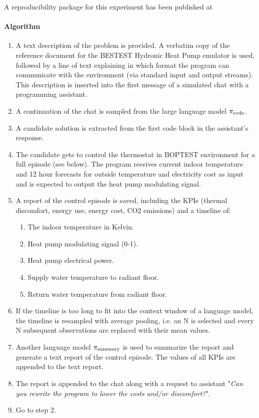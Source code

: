 \begin{remark}
  A reproducibility package for this experiment has been published at \cite{vadimGPTcoder}
\end{remark}

\paragraph{Algorithm}

\begin{enumerate}
  \item A text description of the problem is provided. A verbatim copy of the reference document for the BESTEST Hydronic Heat Pump emulator is used, followed by a line of text explaining in which format the program can communicate with the environment (via standard input and output streams). This description is inserted into the first message of a simulated chat with a programming assistant.
  \item A continuation of the chat is sampled from the large language model $\pi_\text{code}$.
  \item A candidate solution is extracted from the first code block in the assistant’s response.
  \item The candidate gets to control the thermostat in BOPTEST environment for a full episode (see below). The program receives current indoor temperature and 12 hour forecasts for outside temperature and electricity cost as input and is expected to output the heat pump modulating signal.
  \item A report of the control episode is saved, including the KPIs (thermal discomfort, energy use, energy cost, CO2 emissions) and a timeline of:
  \begin{enumerate}
      \item The indoor temperature in Kelvin.
      \item Heat pump modulating signal (0-1).
      \item Heat pump electrical power.
      \item Supply water temperature to radiant floor.
      \item Return water temperature from radiant floor.
  \end{enumerate}
  \item If the timeline is too long to fit into the context window of a language model, the timeline is resampled with average pooling, i.e. an N is selected and every N subsequent observations are replaced with their mean values.
  \item Another language model $\pi_\text{summary}$ is used to summarize the report and generate a text report of the control episode. The values of all KPIs are appended to the text report.
  \item The report is appended to the chat along with a request to assistant "\textit{Can you rewrite the program to lower the costs and/or discomfort?}".
  \item Go to step 2.
\end{enumerate}

